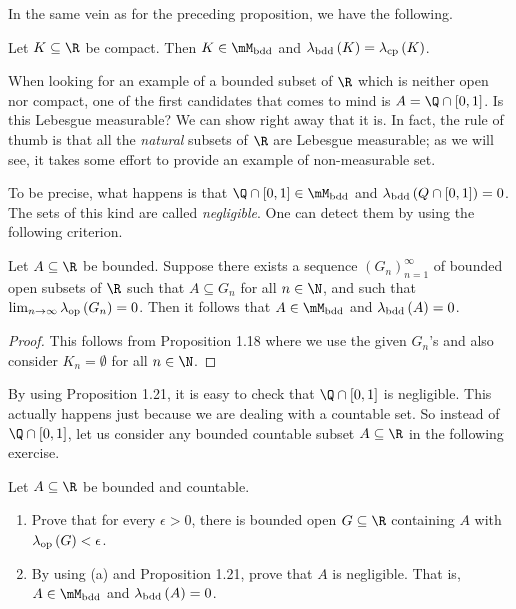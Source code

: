 \documentclass[pmath450]{subfiles}
\begin{document}
    \np In the same vein as for the preceding proposition, we have the following.

    \begin{prop}{}
        Let $K\subseteq\R$ be compact. Then $K\in\mM_{\bdd}$ and $\lambda_{\operatorname{bdd}}\left( K \right)=\lambda_{\operatorname{cp}}\left( K \right)$.
    \end{prop}

    \placeqed[Exercise]

    \np When looking for an example of a bounded subset of $\R$ which is neither open nor compact, one of the first candidates that comes to mind is $A=\Q\cap\left[ 0,1 \right]$. Is this Lebesgue measurable? We can show right away that it is. In fact, the rule of thumb is that all the \textit{natural} subsets of $\R$ are Lebesgue measurable; as we will see, it takes some effort to provide an example of non-measurable set.

    To be precise, what happens is that $\Q\cap\left[ 0,1 \right]\in\mM_{\bdd}$ and $\lambda_{\operatorname{bdd}}\left( Q\cap\left[ 0,1 \right] \right)=0$. The sets of this kind are called \textit{negligible}. One can detect them by using the following criterion.

    \begin{prop}{}
        Let $A\subseteq\R$ be bounded. Suppose there exists a sequence $\left( G_{n} \right)^{\infty}_{n=1}$ of bounded open subsets of $\R$ such that $A\subseteq G_n$ for all $n\in\N$, and such that $\lim_{n\to\infty}\lambda_{\operatorname{op}}\left( G_n \right)=0$. Then it follows that $A\in\mM_{\bdd}$ and $\lambda_{\operatorname{bdd}}\left( A \right)=0$.
    \end{prop}

    \begin{proof}
        This follows from Proposition 1.18 where we use the given $G_n$'s and also consider $K_n=\emptyset$ for all $n\in\N$.
    \end{proof}

    \clearpage

    \np By using Proposition 1.21, it is easy to check that $\Q\cap\left[ 0,1 \right]$ is negligible. This actually happens just because we are dealing with a countable set. So instead of $\Q\cap\left[ 0,1 \right]$, let us consider any bounded countable subset $A\subseteq\R$ in the following exercise.

    \begin{exercise}{}
        Let $A\subseteq\R$ be bounded and countable.
        \begin{enumerate}
            \item Prove that for every $\epsilon>0$, there is bounded open $G\subseteq\R$ containing $A$ with $\lambda_{\operatorname{op}}\left( G \right)<\epsilon$.
            \item By using (a) and Proposition 1.21, prove that $A$ is negligible. That is, $A\in\mM_{\bdd}$ and $\lambda_{\operatorname{bdd}}\left( A \right)=0$.
        \end{enumerate}
    \end{exercise}
\end{document}
